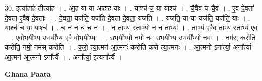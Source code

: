 \documentclass[17pt]{extarticle}
\begin{document}
30. इत्या॑हा॒हे तीत्या॑ह । . आ॒ह॒ या या आ॑हाह॒ याः । . याश्च॑ च॒ या याश्च॑ । . चै॒वैव च॑ चै॒व । . ए॒व दे॒वता॑ दे॒वता॑ ए॒वैव दे॒वताः᳚ । . दे॒वता॒ यज॑ति॒ यज॑ति दे॒वता॑ दे॒वता॒ यज॑ति । . यज॑ति॒ या या यज॑ति॒ यज॑ति॒ याः । . याश्च॑ च॒ या याश्च॑ । . च॒ न न च॑ च॒ न । . न ताभ्य॒ स्ताभ्यो॒ न न ताभ्यः॑ । . ताभ्य॑ ए॒वैव ताभ्य॒ स्ताभ्य॑ ए॒व । . ए॒वोभयी᳚भ्य उ॒भयी᳚भ्य ए॒वै वोभयी᳚भ्यः । . उ॒भयी᳚भ्यो॒ नमो॒ नम॑ उ॒भयी᳚भ्य उ॒भयी᳚भ्यो॒ नमः॑ । . नम॑स् करोति करोति॒ नमो॒ नम॑स् करोति । . क॒रो॒ त्या॒त्मन॑ आ॒त्मनः॑ करोति करो त्या॒त्मनः॑ । . आ॒त्मनो ऽना᳚र्त्या॒ अना᳚र्त्या आ॒त्मन॑ आ॒त्मनो ऽना᳚र्त्यै । . अना᳚र्त्या॒ इत्यना᳚र्त्यै । \newline

\textbf{Ghana Paata } \newline
\end{document}
